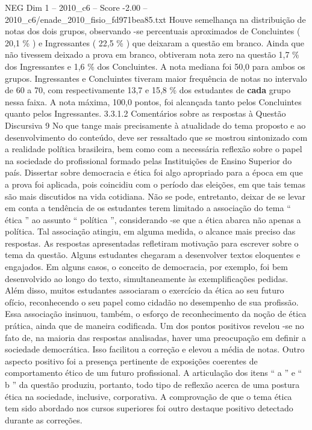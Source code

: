 \begin{textsample}{NEG Dim 1 – 2010\_c6 – Score -2.00 – 2010\_c6/enade\_2010\_fisio\_fd971bea85.txt}
Houve semelhança na distribuição de notas dos dois grupos, observando -se percentuais aproximados de Concluintes ( 20,1 \% ) e Ingressantes ( 22,5 \% ) que deixaram a questão em branco.
Ainda que não tivessem deixado a prova em branco, obtiveram nota zero na questão 1,7 \% dos Ingressantes e 1,6 \% dos Concluintes.
A nota mediana foi 50,0 para ambos os grupos.
Ingressantes e Concluintes tiveram maior frequência de notas no intervalo de 60 a 70, com respectivamente 13,7 e 15,8 \% dos estudantes de \textbf{cada} grupo nessa faixa.
A nota máxima, 100,0 pontos, foi alcançada tanto pelos Concluintes quanto pelos Ingressantes. 3.3.1.2 Comentários sobre as respostas à Questão Discursiva 9 No que tange mais precisamente à atualidade do tema proposto e ao desenvolvimento do conteúdo, deve ser ressaltado que se mostrou sintonizado com a realidade política brasileira, bem como com a necessária reflexão sobre o papel na sociedade do profissional formado pelas Instituições de Ensino Superior do país.
Dissertar sobre democracia e ética foi algo apropriado para a época em que a prova foi aplicada, pois coincidiu com o período das eleições, em que tais temas são mais discutidos na vida cotidiana.
Não se pode, entretanto, deixar de se levar em conta a tendência de os estudantes terem limitado a associação do tema “ ética ” ao assunto “ política ”, considerando -se que a ética abarca não apenas a política.
Tal associação atingiu, em alguma medida, o alcance mais preciso das respostas.
As respostas apresentadas refletiram motivação para escrever sobre o tema da questão.
Alguns estudantes chegaram a desenvolver textos eloquentes e engajados.
Em alguns casos, o conceito de democracia, por exemplo, foi bem desenvolvido ao longo do texto, simultaneamente às exemplificações pedidas.
Além disso, muitos estudantes associaram o exercício da ética ao seu futuro ofício, reconhecendo o seu papel como cidadão no desempenho de sua profissão.
Essa associação insinuou, também, o esforço de reconhecimento da noção de ética prática, ainda que de maneira codificada.
Um dos pontos positivos revelou -se no fato de, na maioria das respostas analisadas, haver uma preocupação em definir a sociedade democrática.
Isso facilitou a correção e elevou a média de notas.
Outro aspecto positivo foi a presença pertinente de exposições coerentes de comportamento ético de um futuro profissional.
A articulação dos itens “ a ” e “ b ” da questão produziu, portanto, todo tipo de reflexão acerca de uma postura ética na sociedade, inclusive, corporativa.
A comprovação de que o tema ética tem sido abordado nos cursos superiores foi outro destaque positivo detectado durante as correções.

\end{textsample}
